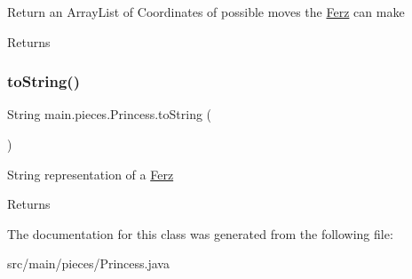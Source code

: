 Return an Array\+List of Coordinates of possible moves the \hyperlink{classmain_1_1pieces_1_1_ferz}{Ferz} can make \begin{DoxyReturn}{Returns}

\end{DoxyReturn}
\hypertarget{classmain_1_1pieces_1_1_princess_a8be1df155dee4a3fbcc4ae1eebea0ff4}{}\label{classmain_1_1pieces_1_1_princess_a8be1df155dee4a3fbcc4ae1eebea0ff4} 
\subsubsection{\texorpdfstring{to\+String()}{toString()}}
{\footnotesize\ttfamily String main.\+pieces.\+Princess.\+to\+String (\begin{DoxyParamCaption}{ }\end{DoxyParamCaption})}

String representation of a \hyperlink{classmain_1_1pieces_1_1_ferz}{Ferz} \begin{DoxyReturn}{Returns}

\end{DoxyReturn}


The documentation for this class was generated from the following file\+:\begin{DoxyCompactItemize}
\item 
src/main/pieces/Princess.\+java\end{DoxyCompactItemize}
